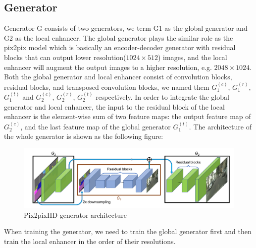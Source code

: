 \subsection{Generator}
Generator G consists of two generators, we term G1 as the global generator and G2 as 
the local enhancer. The global generator plays the similar role as the pix2pix model 
which is basically an encoder-decoder generator with residual blocks that can output 
lower resolution($1024\times512$) images, and the local enhancer will augment the 
output images to a higher resolution, e.g. $2048\times1024$. Both the global generator 
and local enhancer consist of convolution blocks, residual blocks, and transposed convolution blocks,
we named them $G_{1}^{(c)}$, $G_{1}^{(r)}$, $G_{1}^{(t)}$ and $G_{2}^{(c)}$, $G_{2}^{(r)}$, 
$G_{2}^{(t)}$ respectively. In order to integrate the global generator and local enhancer, 
the input to the residual block of the local enhancer is the 
element-wise sum of two feature maps: the output feature map of $G_{2}^{(c)}$, and the last 
feature map of the global generator $G_{1}^{(t)}$. The architecture of the whole generator 
is shown as the following figure:
\begin{figure}[H]
    \begin{center}
    \includegraphics[width=12cm]{figures/pix2pixHD-generator}
    \end{center}
    \caption{Pix2pixHD generator architecture}
    \label{fig:pix2pixHD-generator}
\end{figure}
When training the generator, we need to train the global generator first and then train the 
local enhancer in the order of their resolutions.

